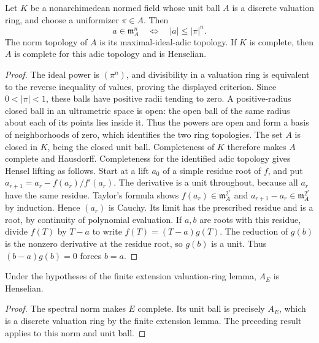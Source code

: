 \begin{lemma}
\label{fw:adic-complete-unit-ball}
\leanok
Let $K$ be a nonarchimedean normed field whose unit ball $A$ is a discrete
valuation ring, and choose a uniformizer $\pi\in A$. Then
\[
 a\in\mathfrak m_A^n\quad\Longleftrightarrow\quad
 |a|\leq|\pi|^n.
\]
The norm topology of $A$ is its maximal-ideal-adic topology. If $K$ is
complete, then $A$ is complete for this adic topology and is Henselian.
\end{lemma}
\begin{proof}
The ideal power is $(\pi^n)$, and divisibility in a valuation ring is
equivalent to the reverse inequality of values, proving the displayed
criterion. Since $0<|\pi|<1$, these balls have positive radii tending
to zero. A positive-radius closed ball in an ultrametric space is open:
the open ball of the same radius about each of its points lies inside it.
Thus the powers are open and form a basis of neighborhoods of zero,
which identifies the two ring topologies. The set $A$ is closed in $K$,
being the closed unit ball. Completeness of $K$ therefore makes $A$
complete and Hausdorff. Completeness for the identified adic topology
gives Hensel lifting as follows. Start at a lift $a_0$ of a simple
residue root of $f$, and put
$a_{r+1}=a_r-f(a_r)/f'(a_r)$. The derivative is a unit throughout,
because all $a_r$ have the same residue. Taylor's formula shows
$f(a_r)\in\mathfrak m_A^{2^r}$ and
$a_{r+1}-a_r\in\mathfrak m_A^{2^r}$ by induction. Hence $(a_r)$ is
Cauchy. Its limit has the prescribed residue and is a root, by
continuity of polynomial evaluation. If $a,b$ are roots with this
residue, divide $f(T)$ by $T-a$ to write $f(T)=(T-a)g(T)$.
The reduction of $g(b)$ is the nonzero derivative at the residue root,
so $g(b)$ is a unit. Thus $(b-a)g(b)=0$ forces $b=a$.
\end{proof}

\begin{corollary}
\label{fw:finite-extension-henselian}
\leanok
Under the hypotheses of the finite extension valuation-ring lemma,
$A_E$ is Henselian.
\end{corollary}
\begin{proof}
The spectral norm makes $E$ complete. Its unit ball is precisely $A_E$,
which is a discrete valuation ring by the finite extension lemma.
The preceding result applies to this norm and unit ball.
\end{proof}


